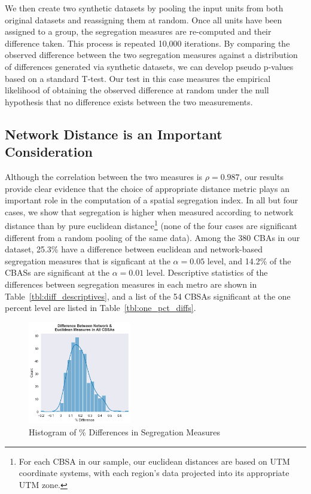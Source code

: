 \documentclass[
  10pt,
]{article}
\begin{document}
We then create two synthetic datasets by pooling the input units from
both original datasets and reassigning them at random. Once all units
have been assigned to a group, the segregation measures are re-computed
and their difference taken. This process is repeated 10,000 iterations.
By comparing the observed difference between the two segregation
measures against a distribution of differences generated via synthetic
datasets, we can develop pseudo p-values based on a standard T-test. Our
test in this case measures the empirical likelihood of obtaining the
observed difference at random under the null hypothesis that no
difference exists between the two measurements.

\hypertarget{network-distance-is-an-important-consideration}{%
\subsection{Network Distance is an Important
Consideration}\label{network-distance-is-an-important-consideration}}

Although the correlation between the two measures is \(\rho=0.987\), our
results provide clear evidence that the choice of appropriate distance
metric plays an important role in the computation of a spatial
segregation index. In all but four cases, we show that segregation is
higher when measured according to network distance than by pure
euclidean distance\footnote{For each CBSA in our sample, our euclidean
  distances are based on UTM coordinate systems, with each region's data
  projected into its appropriate UTM zone.} (none of the four cases are
significant different from a random pooling of the same data). Among the
380 CBAs in our dataset, 25.3\% have a difference between euclidean and
network-based segregation measures that is signficant at the
\(\alpha=0.05\) level, and 14.2\% of the CBASs are significant at the
\(\alpha=0.01\) level. Descriptive statistics of the differences between
segregation measures in each metro are shown in
Table~\ref{tbl:diff_descriptives}, and a list of the 54 CBSAs
significant at the one percent level are listed in
Table~\ref{tbl:one_pct_diffs}.

\begin{figure}
\hypertarget{fig:diff_hists}{%
\centering
\includegraphics[width=0.4\textwidth,height=\textheight]{./figures/diff_hist.png}
\caption{Histogram of \% Differences in Segregation
Measures}\label{fig:diff_hists}
}
\end{figure}
\end{document}
